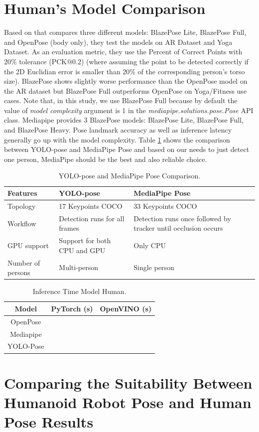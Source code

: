 \section{Human's Model Comparison}
\label{sec:humanmodelcomparison}

Based on \parencite{bazarevsky2020} that compares three different models: BlazePose Lite, BlazePose Full, and OpenPose (body only), they test the models on AR Dataset and Yoga Dataset. As an evaluation metric, they use the Percent of Correct Points with 20\% tolerance (PCK@0.2)
(where assuming the point to be detected correctly if the 2D Euclidian error is smaller than 20\% of the corresponding person's torso size). BlazePose shows slightly worse performance than the OpenPose model on the AR dataset but BlazePose Full outperforms OpenPose on Yoga/Fitness use cases.
Note that, in this study, we use BlazePose Full because by default the value of \emph{model complexity} argument is 1 in the \emph{mediapipe.solutions.pose.Pose} API class. Mediapipe provides 3 BlazePose models: BlazePose Lite, BlazePose Full, and BlazePose Heavy. Pose landmark accuracy as well as inference latency generally go up with the model complexity.
Table \ref{tb:yoloandmediapipecomparison} shows the comparison between YOLO-pose and MediaPipe Pose and based on our needs to just detect one person, MediaPipe should be the best and also reliable choice.  

\begin{longtable}{|p{3cm}|p{5cm}|p{5cm}|}
  \caption{YOLO-pose and MediaPipe Pose Comparison.}
  \label{tb:yoloandmediapipecomparison}\\
  \hline
  \rowcolor[HTML]{C0C0C0}
  \textbf{Features}    & \textbf{YOLO-pose} & \textbf{MediaPipe Pose}\\
  \hline
  Topology             & 17 Keypoints COCO  & 33 Keypoints COCO \\
  \hline
  Workflow             & Detection runs for all frames & Detection runs once followed by tracker until occlusion occurs \\
  \hline
  GPU support          & Support for both CPU and GPU & Only CPU \\
  \hline
  Number of persons    & Multi-person & Single person \\
  \hline
\end{longtable}

\begin{longtable}{|c|c|c|}
  \caption{Inference Time Model Human.}
  \label{tb:inferencehuman}\\
  \hline
  \rowcolor[HTML]{C0C0C0}
  \textbf{Model}    & \textbf{PyTorch (s)} & \textbf{OpenVINO (s)}\\
  \hline
  OpenPose    &  &  \\
  \hline
  Mediapipe   &  &  \\
  \hline
  YOLO-Pose   &  &  \\
  \hline
\end{longtable}

\section{Comparing the Suitability Between Humanoid Robot Pose and Human Pose Results}
\label{sec:comparingsuitabilityresults}
